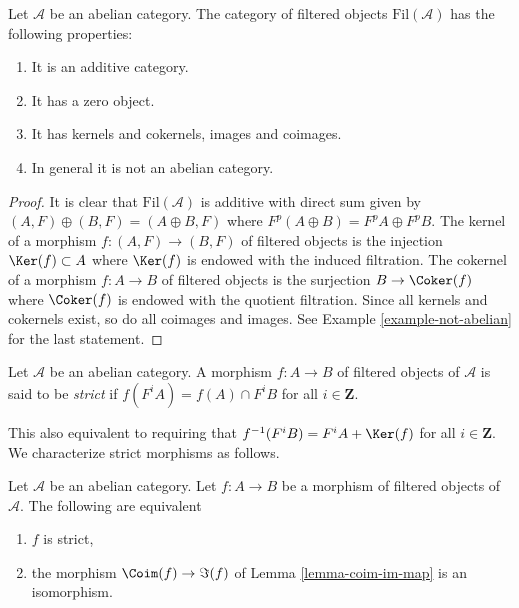 \begin{lemma}
\label{lemma-filtered}
Let $\mathcal{A}$ be an abelian category.
The category of filtered objects $\text{Fil}(\mathcal{A})$
has the following properties:
\begin{enumerate}
\item It is an additive category.
\item It has a zero object.
\item It has kernels and cokernels, images and coimages.
\item In general it is not an abelian category.
\end{enumerate}
\end{lemma}

\begin{proof}
It is clear that $\text{Fil}(\mathcal{A})$ is additive with direct
sum given by $(A, F) \oplus (B, F) = (A \oplus B, F)$ where
$F^p(A \oplus B) = F^pA \oplus F^pB$.
The kernel of a morphism $f : (A, F) \to (B, F)$ of filtered
objects is the injection $\Ker(f) \subset A$ where $\Ker(f)$
is endowed with the induced filtration.
The cokernel of a morphism $f : A \to B$ of filtered
objects is the surjection $B \to \Coker(f)$ where $\Coker(f)$
is endowed with the quotient filtration. Since all kernels and cokernels
exist, so do all coimages and images. See
Example \ref{example-not-abelian}
for the last statement.
\end{proof}

\begin{definition}
\label{definition-strict}
Let $\mathcal{A}$ be an abelian category.
A morphism $f : A \to B$ of filtered objects of $\mathcal{A}$ is
said to be {\it strict} if $f(F^iA) = f(A) \cap F^iB$ for
all $i \in \mathbf{Z}$.
\end{definition}

\noindent
This also equivalent to requiring that $f^{-1}(F^iB) = F^iA + \Ker(f)$
for all $i \in \mathbf{Z}$. We characterize strict morphisms
as follows.

\begin{lemma}
\label{lemma-characterize-strict-general}
Let $\mathcal{A}$ be an abelian category.
Let $f : A \to B$ be a morphism of filtered objects of $\mathcal{A}$.
The following are equivalent
\begin{enumerate}
\item $f$ is strict,
\item the morphism $\Coim(f) \to \Im(f)$ of
Lemma \ref{lemma-coim-im-map}
is an isomorphism.
\end{enumerate}
\end{lemma}

